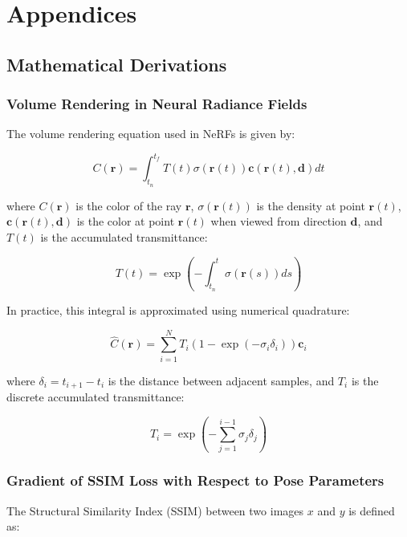 \chapter{Appendices}

\section{Mathematical Derivations}

\subsection{Volume Rendering in Neural Radiance Fields}
The volume rendering equation used in NeRFs is given by:

\begin{equation}
C(\mathbf{r}) = \int_{t_n}^{t_f} T(t) \sigma(\mathbf{r}(t)) \mathbf{c}(\mathbf{r}(t), \mathbf{d}) dt
\end{equation}

where $C(\mathbf{r})$ is the color of the ray $\mathbf{r}$, $\sigma(\mathbf{r}(t))$ is the density at point $\mathbf{r}(t)$, $\mathbf{c}(\mathbf{r}(t), \mathbf{d})$ is the color at point $\mathbf{r}(t)$ when viewed from direction $\mathbf{d}$, and $T(t)$ is the accumulated transmittance:

\begin{equation}
T(t) = \exp\left(-\int_{t_n}^{t} \sigma(\mathbf{r}(s)) ds\right)
\end{equation}

In practice, this integral is approximated using numerical quadrature:

\begin{equation}
\hat{C}(\mathbf{r}) = \sum_{i=1}^{N} T_i (1 - \exp(-\sigma_i \delta_i)) \mathbf{c}_i
\end{equation}

where $\delta_i = t_{i+1} - t_i$ is the distance between adjacent samples, and $T_i$ is the discrete accumulated transmittance:

\begin{equation}
T_i = \exp\left(-\sum_{j=1}^{i-1} \sigma_j \delta_j\right)
\end{equation}

\subsection{Gradient of SSIM Loss with Respect to Pose Parameters}
The Structural Similarity Index (SSIM) between two images $x$ and $y$ is defined as:

